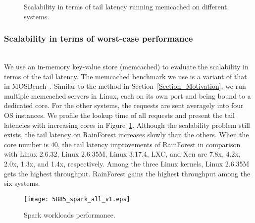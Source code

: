 \documentclass[pageno]{jpaper}
\begin{document}
\begin{figure}[t]
\setlength{\abovecaptionskip}{3pt}
\setlength{\belowcaptionskip}{0pt}
  \centering
    \caption{Scalability in terms of tail latency running memcached on different systems.} \label{fig_scalability.5885.memcached}
\end{figure}

\subsubsection{Scalability in terms of worst-case performance}
\textrm{\\} We use an in-memory key-value store (memcached) to evaluate the scalability in terms of the tail latency. The memcached benchmark we use is a variant of that in MOSBench~\cite{Boyd-Wickizer:2010:MOSBench}. Similar to the method in Section~\ref{Section_Motivation}, we run multiple memcached servers in Linux, each on its own port and being bound to a dedicated core. For the other systems, the requests are sent averagely into four OS instances. We profile the lookup time of all requests and present the tail latencies with increasing cores in Figure~\ref{fig_scalability.5885.memcached}. Although the scalability problem still exists, the tail latency on RainForest increases slowly than the others. When the core number is 40, the tail latency improvements of RainForest in comparison with Linux 2.6.32, Linux 2.6.35M, Linux 3.17.4, LXC, and Xen are 7.8x, 4.2x, 2.0x, 1.3x, and 1.4x, respectively. Among the three Linux kernels, Linux 2.6.35M gets the highest throughput. RainForest gains the highest throughput among the six systems.





\begin{figure}[t]
\setlength{\abovecaptionskip}{3pt}
\setlength{\belowcaptionskip}{0pt}
  \centering
  \texttt{[image: 5885\_spark\_all\_v1.eps]}
  \caption{Spark workloads performance.} \label{fig_spark_all_workloads}
\end{figure}
\end{document}
